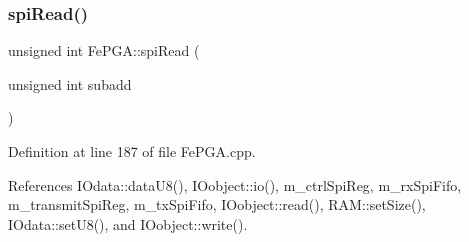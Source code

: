 \mbox{\label{classFePGA_a165f5b70ad30af106ecf9a3ace71d4eb}} 
\subsubsection{\texorpdfstring{spi\+Read()}{spiRead()}\hspace{0.1cm}{\footnotesize\ttfamily [3/3]}}
{\footnotesize\ttfamily unsigned int Fe\+P\+G\+A\+::spi\+Read (\begin{DoxyParamCaption}\item[{unsigned int}]{subadd }\end{DoxyParamCaption})}



Definition at line 187 of file Fe\+P\+G\+A.\+cpp.



References I\+Odata\+::data\+U8(), I\+Oobject\+::io(), m\+\_\+ctrl\+Spi\+Reg, m\+\_\+rx\+Spi\+Fifo, m\+\_\+transmit\+Spi\+Reg, m\+\_\+tx\+Spi\+Fifo, I\+Oobject\+::read(), R\+A\+M\+::set\+Size(), I\+Odata\+::set\+U8(), and I\+Oobject\+::write().


